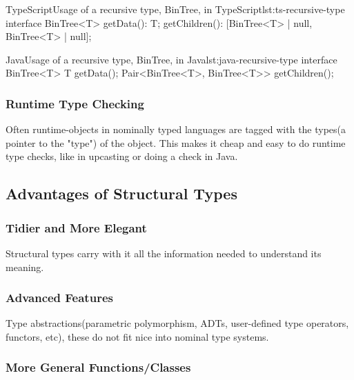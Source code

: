 \begin{code}{TypeScript}{Usage of a recursive type, BinTree, in TypeScript}{lst:ts-recursive-type}
    interface BinTree<T> {
        getData(): T;
        getChildren(): [BinTree<T> | null, BinTree<T> | null];
    }
\end{code}

\begin{code}{Java}{Usage of a recursive type, BinTree, in Java}{lst:java-recursive-type}
    interface BinTree<T> {
        T getData();
        Pair<BinTree<T>, BinTree<T>> getChildren();
    }
\end{code}

\subsubsection{Runtime Type Checking}\label{subsubsec:runtime-type-checking}

Often runtime-objects in nominally typed languages are tagged with the types(a pointer to the "type") of the object.
This makes it cheap and easy to do runtime type checks, like in upcasting or doing a  check in Java.

\subsection{Advantages of Structural Types}\label{subsec:advantages-of-structural-types}

\subsubsection{Tidier and More Elegant}\label{subsubsec:tidier-and-more-elegant}

Structural types carry with it all the information needed to understand its meaning.

\subsubsection{Advanced Features}\label{subsubsec:advanced-type-features}

Type abstractions(parametric polymorphism, ADTs, user-defined type operators, functors, etc), these do not fit nice into nominal type systems.

\subsubsection{More General Functions/Classes}\label{subsubsec:more-general-functions}

